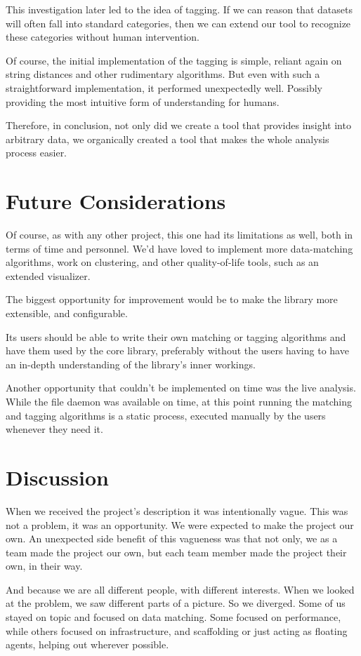 This investigation later led to the idea of tagging.
If we can reason that datasets will often fall into standard categories,
then we can extend our tool to recognize these categories without human intervention.

Of course, the initial implementation of the tagging is simple, reliant again on
string distances and other rudimentary algorithms.
But even with such a straightforward implementation, it performed unexpectedly well.
Possibly providing the most intuitive form of understanding for humans.

Therefore, in conclusion, not only did we create a tool that provides insight into arbitrary data,
we organically created a tool that makes the whole analysis process easier.


\section{Future Considerations}
Of course, as with any other project, this one had its limitations as well, both
in terms of time and personnel.
We'd have loved to implement more data-matching algorithms,
work on clustering, and other quality-of-life tools, such as an extended visualizer.

The biggest opportunity for improvement would be to make the library more extensible,
and configurable.

Its users should be able to write their own matching or tagging algorithms and have
them used by the core library, preferably without the users having to have an in-depth
understanding of the library's inner workings.

Another opportunity that couldn't be implemented on time was the live analysis.
While the file daemon was available on time, at this point running the matching
and tagging algorithms is a static process, executed manually by the users
whenever they need it.


\section{Discussion}

When we received the project's description it was intentionally vague.
This was not a problem, it was an opportunity.
We were expected to make the project our own.
An unexpected side benefit of this vagueness was that not only, we as a team
made the project our own, but each team member made the project their own, in their way.

And because we are all different people, with different interests. When we looked at the problem, we saw different parts of a picture.
So we diverged.
Some of us stayed on topic and focused on data matching.
Some focused on performance, while others focused on infrastructure, and scaffolding or
just acting as floating agents, helping out wherever possible.

